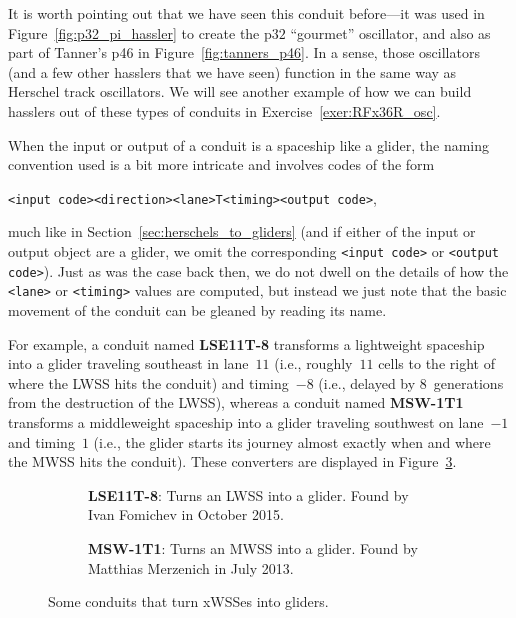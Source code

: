 It is worth pointing out that we have seen this conduit before---it was used in Figure~\ref{fig:p32_pi_hassler} to create the p$32$ ``gourmet'' oscillator, and also as part of Tanner's p46 in Figure~\ref{fig:tanners_p46}. In a sense, those oscillators (and a few other hasslers that we have seen) function in the same way as Herschel track oscillators. We will see another example of how we can build hasslers out of these types of conduits in Exercise~\ref{exer:RFx36R_osc}.

When the input or output of a conduit is a spaceship like a glider, the naming convention used is a bit more intricate and involves codes of the form
\begin{center}
	\verb|<input code><direction><lane>T<timing><output code>|,
\end{center}
much like in Section~\ref{sec:herschels_to_gliders} (and if either of the input or output object are a glider, we omit the corresponding \verb|<input code>| or \verb|<output code>|). Just as was the case back then, we do not dwell on the details of how the \verb|<lane>| or \verb|<timing>| values are computed, but instead we just note that the basic movement of the conduit can be gleaned by reading its name.

For example, a conduit named \textbf{LSE11T-8} transforms a lightweight spaceship into a glider traveling southeast in lane~$11$ (i.e., roughly~$11$ cells to the right of where the LWSS hits the conduit) and timing~$-8$ (i.e., delayed by $8$~generations from the destruction of the LWSS), whereas a conduit named \textbf{MSW-1T1} transforms a middleweight spaceship into a glider traveling southwest on lane~$-1$ and timing~$1$ (i.e., the glider starts its journey almost exactly when and where the MWSS hits the conduit). These converters are displayed in Figure~\ref{fig:XWSS_to_G}.

\begin{figure}[!htb]
	\centering
	\begin{subfigure}{.46\textwidth}
		\centering{}
		\caption{\textbf{LSE11T-8}: Turns an LWSS into a glider. Found by Ivan Fomichev in October 2015.}\label{fig:L_to_G}
	\end{subfigure} \hfill
	\begin{subfigure}{.51\textwidth}
		\centering{}
		\caption{\textbf{MSW-1T1}: Turns an MWSS into a glider. Found by Matthias Merzenich in July 2013.}\label{fig:M_to_G}
	\end{subfigure}
	\caption{Some conduits that turn xWSSes into gliders.}
	\label{fig:XWSS_to_G}
\end{figure}

